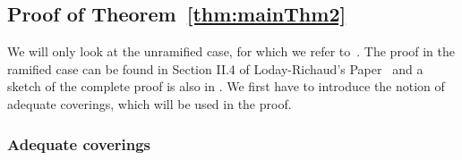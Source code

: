 \subsection{Proof of Theorem~\ref{thm:mainThm2}}\label{sec:proofOfMatrixThm}
We will only look at the unramified case, for which we refer
to~\cite[Sec.II.3]{Loday1994}.
The proof in the ramified case can be found in Section II.4 of Loday-Richaud's
Paper~\cite{Loday1994} and a sketch of the complete proof is also in
\cite{Loday2004}.
We first have to introduce the notion of adequate coverings, which will be used
in the proof.

\subsubsection{Adequate coverings}
